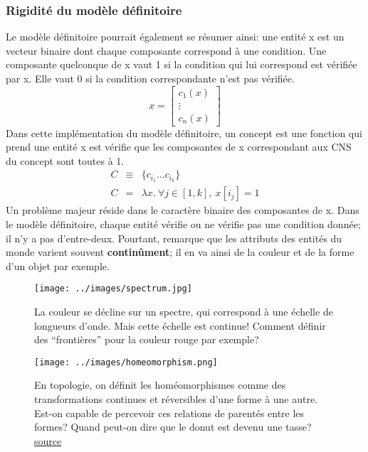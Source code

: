 \documentclass[french]{article}
\begin{document}
				\subsubsection{Rigidité du modèle définitoire}
				Le modèle définitoire pourrait également se résumer ainsi: une entité x est un vecteur binaire dont chaque composante correspond à une condition. Une  composante quelconque de x vaut 1 si la condition qui lui correspond est vérifiée par x. Elle vaut 0 si la condition correspondante n'est pas vérifiée.
				\begin{equation*}
				x = \left[\begin{array}{c}
				c_1(x) \\
				\vdots\\
				c_n(x)
				\end{array}\right]
				\end{equation*}
				Dans cette implémentation du modèle définitoire, un concept est une fonction qui prend une entité x est vérifie que les composantes de x correspondant aux CNS du concept sont toutes à 1.
				\begin{eqnarray*}
				C &\equiv&  \lbrace c_{i_1} \dots c_{i_k} \rbrace \\
				C &=& \lambda x. \ \forall j \in [1, k], \ x[i_j] = 1
				\end{eqnarray*}
				Un problème majeur réside dans le caractère binaire des composantes de x. Dans le modèle définitoire, chaque entité vérifie ou ne vérifie pas une condition donnée; il n'y a pas d'entre-deux. Pourtant, \cite{rosch1973} remarque que les attributs des entités du monde varient souvent \textbf{continûment}; il en va ainsi de la couleur et de la forme d'un objet par exemple.
				\begin{figure}[H]
					\centering
					\texttt{[image: ../images/spectrum.jpg]}
					\caption{La couleur se décline sur un spectre, qui correspond à une échelle de longueurs d'onde. Mais cette échelle est continue! Comment définir des ``frontières'' pour la couleur rouge par exemple?}
				\end{figure}			
				\begin{figure}[H]
					\centering
					\texttt{[image: ../images/homeomorphism.png]}
					\caption{En topologie, on définit les homéomorphismes comme des transformations continues et réversibles d'une forme à une autre. Est-on capable de percevoir ces relations de parentés entre les formes? Quand peut-on dire que le donut est devenu une tasse? \href{https://prateekvjoshi.files.wordpress.com/2014/11/3-donut-coffee.png}{source}}
				\end{figure}				
\end{document}
